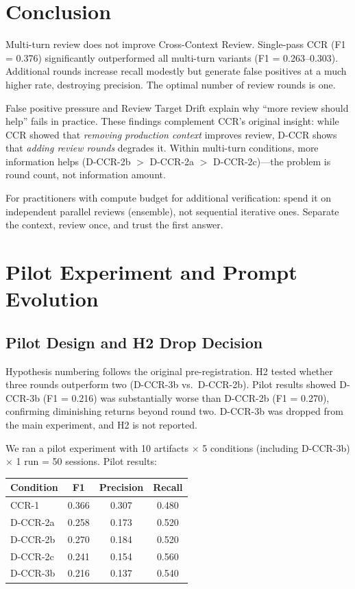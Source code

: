 \documentclass[11pt]{article}
\begin{document}
\section{Conclusion}

Multi-turn review does not improve Cross-Context Review.
Single-pass CCR (F1 = 0.376) significantly outperformed all multi-turn variants (F1 = 0.263--0.303).
Additional rounds increase recall modestly but generate false positives at a much higher rate, destroying precision.
The optimal number of review rounds is one.

False positive pressure and Review Target Drift explain why ``more review should help'' fails in practice.
These findings complement CCR's original insight: while CCR showed that \emph{removing production context} improves review, D-CCR shows that \emph{adding review rounds} degrades it.
Within multi-turn conditions, more information helps (D-CCR-2b $>$ D-CCR-2a $>$ D-CCR-2c)---the problem is round count, not information amount.

For practitioners with compute budget for additional verification: spend it on independent parallel reviews (ensemble), not sequential iterative ones.
Separate the context, review once, and trust the first answer.



\appendix

\section{Pilot Experiment and Prompt Evolution}
\label{app:pilot}

\subsection{Pilot Design and H2 Drop Decision}

Hypothesis numbering follows the original pre-registration.
H2 tested whether three rounds outperform two (D-CCR-3b vs.\ D-CCR-2b).
Pilot results showed D-CCR-3b (F1 = 0.216) was substantially worse than D-CCR-2b (F1 = 0.270), confirming diminishing returns beyond round two.
D-CCR-3b was dropped from the main experiment, and H2 is not reported.

We ran a pilot experiment with 10 artifacts $\times$ 5 conditions (including D-CCR-3b) $\times$ 1 run = 50 sessions. Pilot results:

\begin{table}[h]
\centering
\small
\begin{tabular}{lccc}
\toprule
\textbf{Condition} & \textbf{F1} & \textbf{Precision} & \textbf{Recall} \\
\midrule
CCR-1 & 0.366 & 0.307 & 0.480 \\
D-CCR-2a & 0.258 & 0.173 & 0.520 \\
D-CCR-2b & 0.270 & 0.184 & 0.520 \\
D-CCR-2c & 0.241 & 0.154 & 0.560 \\
D-CCR-3b & 0.216 & 0.137 & 0.540 \\
\bottomrule
\end{tabular}
\end{table}
\end{document}
